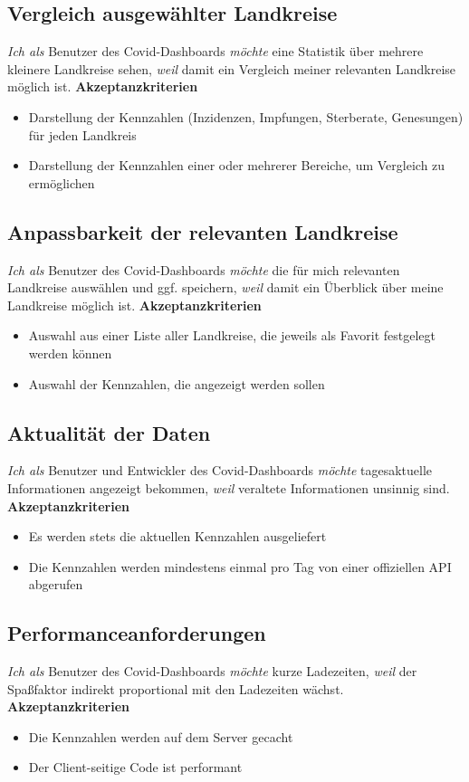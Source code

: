\documentclass[conference]{IEEEtran}
\begin{document}
\subsection{Vergleich ausgewählter Landkreise}
\textit{Ich als} Benutzer des Covid-Dashboards
\textit{möchte} eine Statistik über mehrere kleinere Landkreise sehen,
\textit{weil} damit ein Vergleich meiner relevanten Landkreise möglich ist.
\newline
\textbf{Akzeptanzkriterien}
\begin{itemize}
    \item Darstellung der Kennzahlen (Inzidenzen, Impfungen, Sterberate, Genesungen) für jeden Landkreis
    \item Darstellung der Kennzahlen einer oder mehrerer Bereiche, um Vergleich zu ermöglichen
\end{itemize}

\subsection{Anpassbarkeit der relevanten Landkreise}
\textit{Ich als} Benutzer des Covid-Dashboards
\textit{möchte} die für mich relevanten Landkreise auswählen und ggf. speichern,
\textit{weil} damit ein Überblick über meine Landkreise möglich ist.
\newline
\textbf{Akzeptanzkriterien}
\begin{itemize}
    \item Auswahl aus einer Liste aller Landkreise, die jeweils als Favorit festgelegt werden können
    \item Auswahl der Kennzahlen, die angezeigt werden sollen
\end{itemize}

\subsection{Aktualität der Daten}
\textit{Ich als} Benutzer und Entwickler des Covid-Dashboards
\textit{möchte} tagesaktuelle Informationen angezeigt bekommen,
\textit{weil} veraltete Informationen unsinnig sind.
\newpage
\textbf{Akzeptanzkriterien}
\begin{itemize}
    \item Es werden stets die aktuellen Kennzahlen ausgeliefert
    \item Die Kennzahlen werden mindestens einmal pro Tag von einer offiziellen API abgerufen
\end{itemize}

\subsection{Performanceanforderungen}
\textit{Ich als} Benutzer des Covid-Dashboards
\textit{möchte} kurze Ladezeiten,
\textit{weil} der Spaßfaktor indirekt proportional mit den Ladezeiten wächst.
\newline
\textbf{Akzeptanzkriterien}
\begin{itemize}
    \item Die Kennzahlen werden auf dem Server gecacht
    \item Der Client-seitige Code ist performant
\end{itemize}
\end{document}
